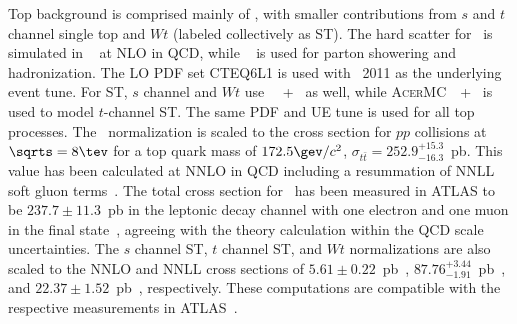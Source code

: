 Top background is comprised mainly of \ttbar, with smaller
contributions from $s$ and $t$ channel single top and $Wt$ (labeled
collectively as ST). The
hard scatter for \ttbar~is simulated in \POWHEG~\cite{bib:Frixione:2003ei} at NLO in QCD,
while ~\cite{bib:Sjostrand:2006za} is used for parton showering and
hadronization. The LO PDF set CTEQ6L1 is used with \PERUGIA~2011 as
the underlying event tune. For ST,
$s$ channel and $Wt$ use \POWHEGns~\cite{bib:Alioli:2009je,bib:Re:2010bp}~+~ as well, while
\textsc{AcerMC}~\cite{bib:Kersevan:2004yg}~+~ is used to model $t$-channel ST. The same
PDF and UE tune is used for all top processes. The
\ttbar~normalization is scaled to the cross section for $pp$
collisions at $\sqrts = 8 \tev$ for a top quark mass of
$172.5 \gev/c^2$, $\sigma_{t\bar{t}}=252.9^{+15.3}_{-16.3}$~pb. This
value has been calculated at NNLO in QCD including a resummation of
NNLL soft gluon
terms~\cite{bib:Cacciari:2011hy,bib:Beneke:2011mq,bib:Baernreuther:2012ws,bib:Czakon:2012zr,bib:Czakon:2012pz,bib:Czakon:2013goa,bib:Czakon:2011xx}.
The total cross section for \ttbar~has been measured in ATLAS to be
$237.7\pm11.3$~pb in the leptonic decay channel with one
electron and one muon in the final
state~\cite{bib:ttbar_cross_section}, agreeing with the
theory calculation within the QCD scale uncertainties. The $s$ channel
ST, $t$ channel ST, and $Wt$ normalizations are also scaled to the
NNLO and NNLL cross sections of
$5.61\pm0.22$~pb~\cite{bib:Kidonakis:2010tc},
$87.76^{+3.44}_{-1.91}$~pb~\cite{bib:Kidonakis:2011wy}, and
$22.37\pm1.52$~pb~\cite{bib:Kidonakis:2010ux}, respectively. These
computations are compatible with the respective measurements in
ATLAS~\cite{bib:tchan_cross_section,bib:Wt_cross_section}.

